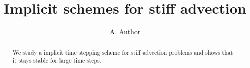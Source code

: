 \documentclass{article}
\title{Implicit schemes for stiff advection}
\author{A. Author}
\begin{document}
\maketitle

\begin{abstract}
We study a implicit time stepping scheme for stiff advection problems and shows that it stays stable for large time steps.
\end{abstract}






\end{document}
